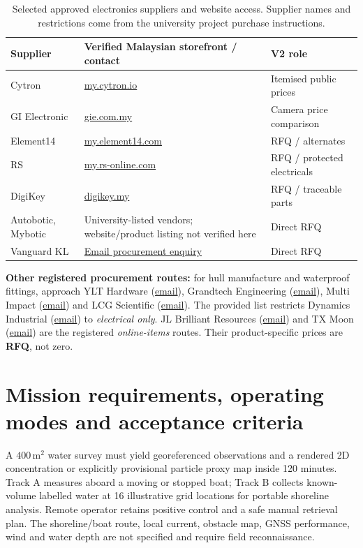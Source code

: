 \documentclass[10pt,a4paper]{article}
\begin{document}
\begin{table}[H]\centering\footnotesize
\caption{Selected approved electronics suppliers and website access. Supplier names and restrictions come from the university project purchase instructions.}
\begin{tabularx}{\linewidth}{@{}L{3cm}Y L{3.1cm}@{}}\toprule
Supplier & Verified Malaysian storefront / contact & V2 role \\\midrule
Cytron & \href{https://my.cytron.io/}{my.cytron.io} & Itemised public prices \\
GI Electronic & \href{https://www.gie.com.my/}{gie.com.my} & Camera price comparison \\
Element14 & \href{https://my.element14.com/}{my.element14.com} & RFQ / alternates \\
RS & \href{https://my.rs-online.com/web/}{my.rs-online.com} & RFQ / protected electricals \\
DigiKey & \href{https://www.digikey.my/en}{digikey.my} & RFQ / traceable parts \\
Autobotic, Mybotic & University-listed vendors; website/product listing not verified here & Direct RFQ \\
Vanguard KL & \href{mailto:enquiry@vanguardelectronic.com.my}{Email procurement enquiry} & Direct RFQ \\
\bottomrule\end{tabularx}\end{table}
\textbf{Other registered procurement routes:} for hull manufacture and waterproof fittings, approach YLT Hardware (\href{mailto:atikah_ylthardware@outlook.com}{email}), Grandtech Engineering (\href{mailto:adnan_matsarip@yahoo.com.my}{email}), Multi Impact (\href{mailto:Yang@multiimpact.com.my}{email}) and LCG Scientific (\href{mailto:lcgscientificl@gmail.com}{email}). The provided list restricts Dynamics Industrial (\href{mailto:dynamicinds@gmail.com}{email}) to \emph{electrical only}. JL Brilliant Resources (\href{mailto:jlbresources2133@gmail.com}{email}) and TX Moon (\href{mailto:ray.txmoon@gmail.com}{email}) are the registered \emph{online-items} routes. Their product-specific prices are \textbf{RFQ}, not zero.

\section{Mission requirements, operating modes and acceptance criteria}
A $400\,\mathrm{m}^2$ water survey must yield georeferenced observations and a rendered 2D concentration or explicitly provisional particle proxy map inside 120 minutes. Track A measures aboard a moving or stopped boat; Track B collects known-volume labelled water at 16 illustrative grid locations for portable shoreline analysis. Remote operator retains positive control and a safe manual retrieval plan. The shoreline/boat route, local current, obstacle map, GNSS performance, wind and water depth are not specified and require field reconnaissance.
\end{document}
